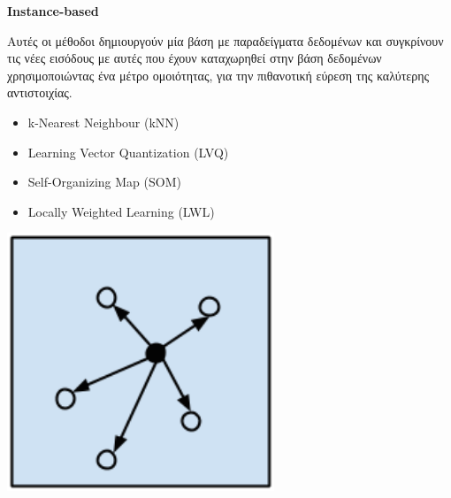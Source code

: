 \begin{minipage}{0.5\textwidth}

  \textbf{\large Instance-based}

  Αυτές οι μέθοδοι δημιουργούν μία βάση με
  παραδείγματα δεδομένων και συγκρίνουν τις νέες εισόδους με αυτές που έχουν
  καταχωρηθεί στην βάση δεδομένων χρησιμοποιώντας ένα μέτρο ομοιότητας,
  για την πιθανοτική εύρεση της καλύτερης αντιστοιχίας.
  \begin{itemize}
    \setlength\itemsep{0em}
    \item{k-Nearest Neighbour (kNN)}
    \item{Learning Vector Quantization (LVQ)}
    \item{Self-Organizing Map (SOM)}
    \item{Locally Weighted Learning (LWL)}
  \end{itemize}
\end{minipage}
\begin{minipage}{0.5\textwidth}
  \begin{center}
    \includegraphics[width=0.6\textwidth]{./images/chapter3/instance_based_algorithms.png}
  \end{center}
\end{minipage}

